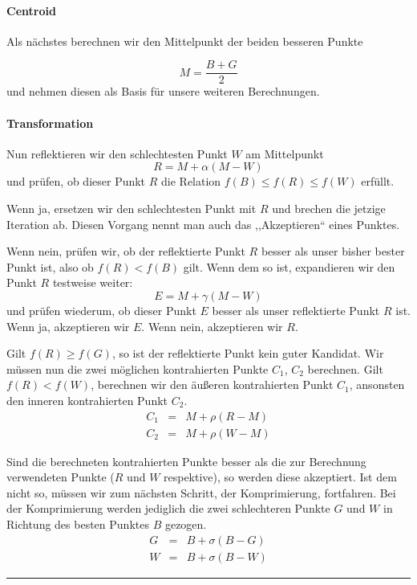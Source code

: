 \documentclass[naustrian]{article}
\begin{document}
\paragraph{Centroid}

Als nächstes berechnen wir den Mittelpunkt der beiden besseren Punkte

\[
    M=\frac{B+G}{2}
\]
und nehmen diesen als Basis für unsere weiteren Berechnungen.


\paragraph{Transformation}

Nun reflektieren wir den schlechtesten Punkt $W$ am Mittelpunkt
\[
    R=M+\alpha(M-W)
\]
und prüfen, ob dieser Punkt $R$ die Relation $f(B)\leq f(R)\leq f(W)$
erfüllt.

Wenn ja, ersetzen wir den schlechtesten Punkt mit $R$ und brechen
die jetzige Iteration ab. Diesen Vorgang nennt man auch das ,,Akzeptieren``
eines Punktes.

Wenn nein, prüfen wir, ob der reflektierte Punkt $R$ besser als unser
bisher bester Punkt ist, also ob $f(R)<f(B)$ gilt. Wenn dem so ist,
expandieren wir den Punkt $R$ testweise weiter:
\[
    E=M+\gamma(M-W)
\]
und prüfen wiederum, ob dieser Punkt $E$ besser als unser reflektierte
Punkt $R$ ist. Wenn ja, akzeptieren wir $E$. Wenn nein, akzeptieren
wir $R$.

Gilt $f(R)\geq f(G)$, so ist der reflektierte Punkt kein guter Kandidat.  Wir
müssen nun die zwei möglichen kontrahierten
Punkte\cite{nelder-mead-scholarpedia} $C_{1}$, $C_{2}$
berechnen.\cite{nelder-mead-unknown} Gilt $f(R)<f(W)$, berechnen wir den
äußeren kontrahierten Punkt $C_{1}$, ansonsten den inneren kontrahierten Punkt
$C_{2}.$
\begin{eqnarray*}
    C_{1} & = & M+\rho(R-M)\\
    C_{2} & = & M+\rho(W-M)
\end{eqnarray*}

Sind die berechneten kontrahierten Punkte besser als die zur Berechnung
verwendeten Punkte ($R$ und $W$ respektive), so werden diese akzeptiert.
Ist dem nicht so, müssen wir zum nächsten Schritt, der Komprimierung,
fortfahren. Bei der Komprimierung werden jediglich die zwei schlechteren
Punkte $G$ und $W$ in Richtung des besten Punktes $B$ gezogen.
\begin{eqnarray*}
    G & = & B+\sigma(B-G)\\
    W & = & B+\sigma(B-W)
\end{eqnarray*}
\rule[0.5ex]{1\columnwidth}{1pt}\\
\end{document}
